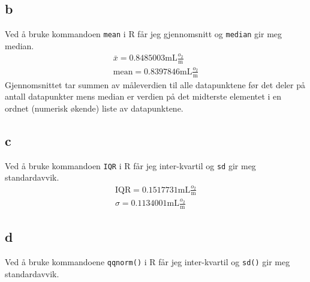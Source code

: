 \subsection*{b}

Ved å bruke kommandoen \texttt{mean} i R får jeg gjennomsnitt og \texttt{median} gir meg median.
\begin{align*}
    \bar{x} = 0.8485003\mathrm{mL}\frac{o_2}{\mathrm{m}}\\
    \mathrm{mean} = 0.8397846\mathrm{mL}\frac{o_2}{\mathrm{m}}
\end{align*}
Gjennomsnittet tar summen av måleverdien til alle datapunktene før det deler på antall datapunkter mens median er verdien på det midterste elementet i en ordnet (numerisk økende) liste av datapunktene.

\subsection*{c}

Ved å bruke kommandoen \texttt{IQR} i R får jeg inter-kvartil og \texttt{sd} gir meg standardavvik.
\begin{align*}
    \mathrm{IQR} = 0.1517731\mathrm{mL}\frac{o_2}{\mathrm{m}}\\
    \sigma = 0.1134001\mathrm{mL}\frac{o_2}{\mathrm{m}}
\end{align*}

\subsection*{d}

Ved å bruke kommandoene \texttt{qqnorm()} i R får jeg inter-kvartil og \texttt{sd()} gir meg standardavvik.

